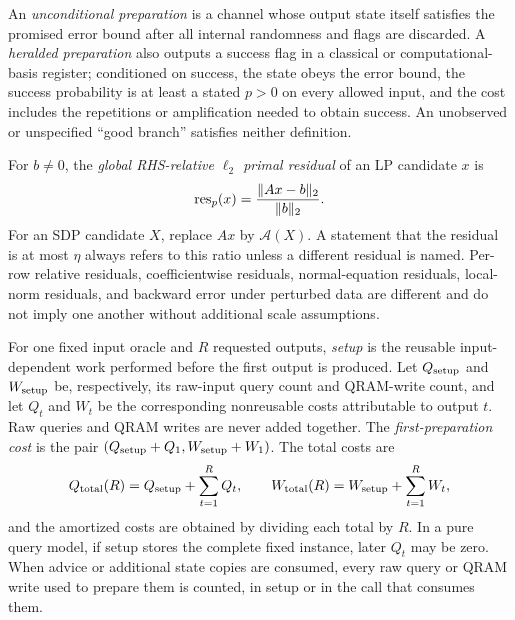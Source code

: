 \begin{definition}
\label{def:heralded-output}
An \emph{unconditional preparation} is a channel whose output state itself
satisfies the promised error bound after all internal randomness and flags
are discarded.  A \emph{heralded preparation} also outputs a success flag in a classical or
computational-basis register; conditioned on success, the state obeys the
error bound, the success probability is at least a stated $p>0$ on every
allowed input, and the cost includes the repetitions or amplification needed
to obtain success.  An unobserved or unspecified ``good branch'' satisfies neither
definition.
\end{definition}

\begin{definition}
\label{def:global-residual}
For $b\neq0$, the \emph{global RHS-relative $\ell_2$ primal residual} of an LP
candidate $x$ is
\begin{equation}
 \operatorname{res}_p(x)=\frac{\lVert Ax-b\rVert_2}{\lVert b\rVert_2}.
 \label{eq:global-residual}
\end{equation}
For an SDP candidate $X$, replace $Ax$ by $\mathcal A(X)$.  A statement that
the residual is at most $\eta$ always refers to this ratio unless a different
residual is named.  Per-row relative residuals, coefficientwise residuals,
normal-equation residuals, local-norm residuals, and backward error under
perturbed data are different and do not imply one another without additional
scale assumptions.
\end{definition}

\begin{definition}
\label{def:amortized-accounting}
For one fixed input oracle and $R$ requested outputs, \emph{setup} is the
reusable input-dependent work performed before the first output is produced.
Let $Q_{\rm setup}$ and $W_{\rm setup}$ be, respectively, its raw-input query
count and QRAM-write count, and let $Q_t$ and $W_t$ be the corresponding
nonreusable costs attributable to output $t$.  Raw queries and QRAM writes are
never added together.  The
\emph{first-preparation cost} is the pair
$(Q_{\rm setup}+Q_1,W_{\rm setup}+W_1)$.  The total costs are
\begin{equation}
 Q_{\rm total}(R)=Q_{\rm setup}+\sum_{t=1}^R Q_t,
 \qquad
 W_{\rm total}(R)=W_{\rm setup}+\sum_{t=1}^R W_t,
 \label{eq:total-query-ledger}
\end{equation}
and the amortized costs are obtained by dividing each total by $R$.  In a
pure query model, if setup stores the complete fixed instance, later $Q_t$ may
be zero.  When advice or additional state copies are consumed, every raw
query or QRAM write used to prepare them is counted, in setup or in the call
that consumes them.
\end{definition}

